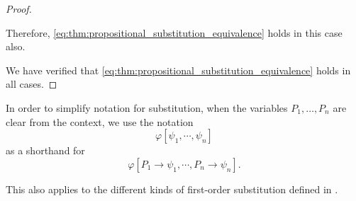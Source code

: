 \begin{proof}
\begin{itemize}
    Therefore, \eqref{eq:thm:propositional_substitution_equivalence} holds in this case also.
  \end{itemize}

  We have verified that \eqref{eq:thm:propositional_substitution_equivalence} holds in all cases.
\end{proof}

\begin{remark}\label{rem:substitution_shorthand_notation}
  In order to simplify notation for substitution, when the variables \( P_1, \ldots, P_n \) are clear from the context, we use the notation
  \begin{equation*}
    \varphi[\psi_1, \cdots, \psi_n]
  \end{equation*}
  as a shorthand for
  \begin{equation*}
    \varphi[P_1 \to \psi_1, \cdots, P_n \to \psi_n].
  \end{equation*}

  This also applies to the different kinds of first-order substitution defined in .
\end{remark}

